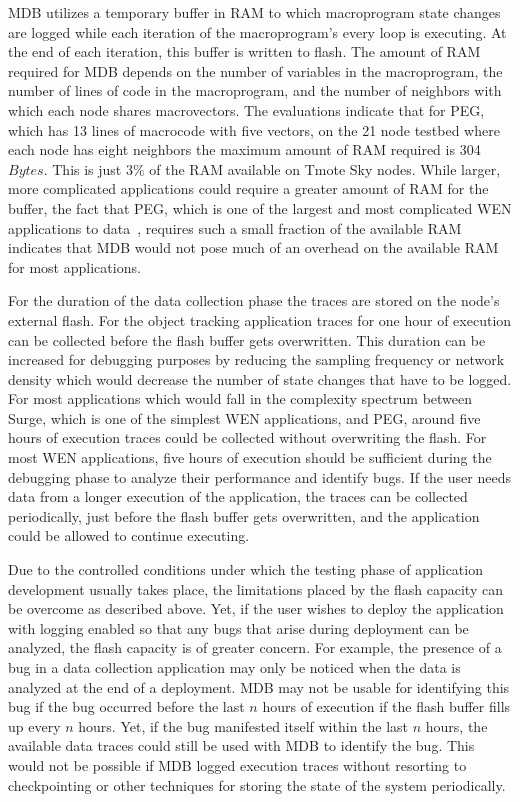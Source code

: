 MDB utilizes a temporary buffer in RAM to which macroprogram state changes are
logged while each iteration of the macroprogram's every loop is executing. At
the end of each iteration, this buffer is written to flash. The amount of RAM
required for MDB depends on the number of variables in the macroprogram, the
number of lines of code in the macroprogram, and the number of neighbors with
which each node shares macrovectors. The evaluations indicate that for PEG,
which has 13 lines of macrocode with five vectors, on the 21 node testbed where
each node has eight neighbors the maximum amount of RAM required is 304
$Bytes$. This is just $3\%$ of the RAM available on Tmote Sky nodes. While
larger, more complicated applications could require a greater amount of RAM for
the buffer, the fact that PEG, which is one of the largest and most complicated
WEN applications to data~\cite{Whitehousea}, requires such a small fraction of
the available RAM indicates that MDB would not pose much of an overhead on the
available RAM for most applications.

For the duration of the data collection phase the traces are stored on the
node's external flash. For the object tracking application traces for one hour
of execution can be collected before the flash buffer gets overwritten. This
duration can be increased for debugging purposes by reducing the sampling
frequency or network density which would decrease the number of state changes
that have to be logged. For most applications which would fall in the complexity
spectrum between Surge, which is one of the simplest WEN applications, and PEG,
around five hours of execution traces could be collected without overwriting the
flash. For most WEN applications, five hours of execution should be sufficient
during the debugging phase to analyze their performance and identify bugs. If
the user needs data from a longer execution of the application, the traces can
be collected periodically, just before the flash buffer gets overwritten, and
the application could be allowed to continue executing.

Due to the controlled conditions under which the testing phase of application
development usually takes place, the limitations placed by the flash capacity
can be overcome as described above. Yet, if the user wishes to deploy the
application with logging enabled so that any bugs that arise during deployment
can be analyzed, the flash capacity is of greater concern. For example, the
presence of a bug in a data collection application may only be noticed when the
data is analyzed at the end of a deployment. MDB may not be usable for
identifying this bug if the bug occurred before the last $n$ hours of execution
if the flash buffer fills up every $n$ hours. Yet, if the bug manifested itself
within the last $n$ hours, the available data traces could still be used with
MDB to identify the bug. This would not be possible if MDB logged execution
traces without resorting to checkpointing or other techniques for storing the
state of the system periodically.

